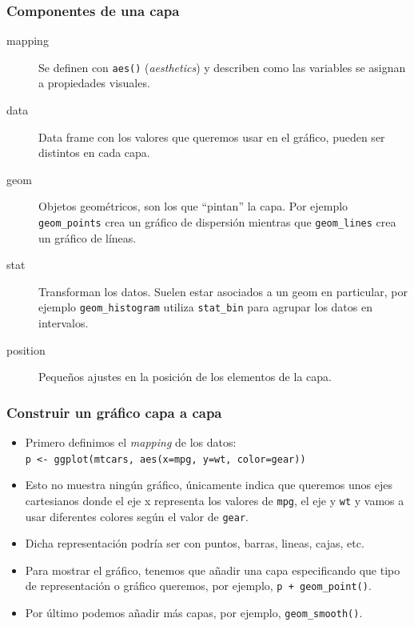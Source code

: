 \documentclass{beamer}
\begin{document}
\begin{frame}
\frametitle{Componentes de una capa}

\begin{description}
\item[mapping] Se definen con \texttt{aes()} (\textit{aesthetics}) y describen como las variables se asignan a propiedades visuales.

\item[data] Data frame con los valores que queremos usar en el gráfico, pueden ser distintos en cada capa.

\item[geom] Objetos geométricos, son los que ``pintan'' la capa. Por ejemplo \texttt{geom\_points} crea un gráfico de dispersión mientras que \texttt{geom\_lines} crea un gráfico de líneas.

\item[stat] Transforman los datos. Suelen estar asociados a un geom en particular, por ejemplo \texttt{geom\_histogram} utiliza \texttt{stat\_bin} para agrupar los datos en intervalos.

\item[position] Pequeños ajustes en la posición de los elementos de la capa.
\end{description}

\end{frame}

\begin{frame}
\frametitle{Construir un gráfico capa a capa}

\begin{itemize}
\item Primero definimos el \textit{mapping} de los datos: \\ \texttt{p <- ggplot(mtcars, aes(x=mpg, y=wt, color=gear))}
\item Esto no muestra ningún gráfico, únicamente indica que queremos unos ejes cartesianos donde el eje x representa los valores de \texttt{mpg}, el eje y \texttt{wt} y vamos a usar diferentes colores según el valor de \texttt{gear}.
\item Dicha representación podría ser con puntos, barras, lineas, cajas, etc.
\item Para mostrar el gráfico, tenemos que añadir una capa especificando que tipo de representación o gráfico queremos, por ejemplo, \texttt{p + geom\_point()}.
\item Por último podemos añadir más capas, por ejemplo, \texttt{geom\_smooth()}.
\end{itemize}
\end{frame}
\end{document}

